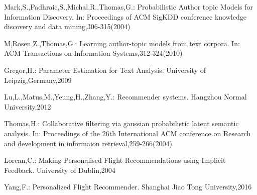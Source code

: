 \documentclass{llncs}
\begin{document}
\begin{thebibliography}{1}
Mark,S.,Padhraic,S.,Michal,R.,Thomas,G.:
Probabilistic Author topic Models for Information Discovery.
In: Proceedings of ACM SigKDD conference knowledge discovery and data mining,306-315(2004)

M,Rosen,Z.,Thomas,G.:
Learning author-topic models from text corpora.
In: ACM Transactions on Information Systems,312-324(2010)

Gregor,H.:
Parameter Estimation for Text Analysis.
University of Leipzig,Germany,2009

Lu,L.,Matus,M.,Yeung,H.,Zhang,Y.:
Recommender systems.
Hangzhou Normal University,2012

Thomas,H.:
Collaborative filtering via gaussian probabilistic latent semantic analysis.
In: Proceedings of the 26th International ACM conference on Research and development in informaion retrieval,259-266(2004)

Lorcan,C.:
Making Personalised Flight Recommendations using Implicit Feedback.
University of Dublin,2004

Yang,F.:
Personalized Flight Recommender.
Shanghai Jiao Tong University,2016

\end{thebibliography}
\end{document}
